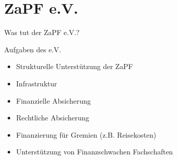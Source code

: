 \documentclass[compress, aspectratio=169]{beamer}
\begin{document}
\section{ZaPF e.V.}

\begin{frame}{Was tut der ZaPF e.V.?}
  \begin{block}{Aufgaben des e.V.}
    \begin{itemize}
      \item Strukturelle Unterstützung der ZaPF
      \item Infrastruktur
      \item Finanzielle Absicherung
      \item Rechtliche Absicherung
      \item Finanzierung für Gremien (z.B. Reisekosten)
      \item Unterstützung von Finanzschwachen Fachschaften
    \end{itemize}
  \end{block}
\end{frame}
  
\end{document}
